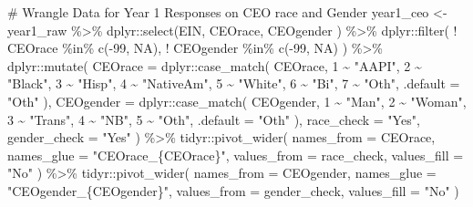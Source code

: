 \documentclass[
  letterpaper,
]{scrbook}
\newenvironment{Shaded}{\begin{snugshade}}{\end{snugshade}}
\newcommand{\AttributeTok}[1]{\textcolor[rgb]{0.40,0.45,0.13}{#1}}
\newcommand{\CommentTok}[1]{\textcolor[rgb]{0.37,0.37,0.37}{#1}}
\newcommand{\ConstantTok}[1]{\textcolor[rgb]{0.56,0.35,0.01}{#1}}
\newcommand{\DecValTok}[1]{\textcolor[rgb]{0.68,0.00,0.00}{#1}}
\newcommand{\FunctionTok}[1]{\textcolor[rgb]{0.28,0.35,0.67}{#1}}
\newcommand{\NormalTok}[1]{\textcolor[rgb]{0.00,0.23,0.31}{#1}}
\newcommand{\OtherTok}[1]{\textcolor[rgb]{0.00,0.23,0.31}{#1}}
\newcommand{\SpecialCharTok}[1]{\textcolor[rgb]{0.37,0.37,0.37}{#1}}
\newcommand{\StringTok}[1]{\textcolor[rgb]{0.13,0.47,0.30}{#1}}
\begin{document}
\begin{Shaded}
\begin{Highlighting}[]
\CommentTok{\# Wrangle Data for Year 1 Responses on CEO race and Gender}
\NormalTok{year1\_ceo }\OtherTok{\textless{}{-}}\NormalTok{ year1\_raw }\SpecialCharTok{\%\textgreater{}\%} 
\NormalTok{  dplyr}\SpecialCharTok{::}\FunctionTok{select}\NormalTok{(EIN, CEOrace, CEOgender ) }\SpecialCharTok{\%\textgreater{}\%} 
\NormalTok{  dplyr}\SpecialCharTok{::}\FunctionTok{filter}\NormalTok{(  }\SpecialCharTok{!}\NormalTok{ CEOrace }\SpecialCharTok{\%in\%} \FunctionTok{c}\NormalTok{(}\SpecialCharTok{{-}}\DecValTok{99}\NormalTok{, }\ConstantTok{NA}\NormalTok{),}
                  \SpecialCharTok{!}\NormalTok{ CEOgender }\SpecialCharTok{\%in\%} \FunctionTok{c}\NormalTok{(}\SpecialCharTok{{-}}\DecValTok{99}\NormalTok{, }\ConstantTok{NA}\NormalTok{)  ) }\SpecialCharTok{\%\textgreater{}\%} 
\NormalTok{  dplyr}\SpecialCharTok{::}\FunctionTok{mutate}\NormalTok{(}
    \AttributeTok{CEOrace =}\NormalTok{ dplyr}\SpecialCharTok{::}\FunctionTok{case\_match}\NormalTok{(}
\NormalTok{      CEOrace,}
      \DecValTok{1} \SpecialCharTok{\textasciitilde{}} \StringTok{"AAPI"}\NormalTok{, }\DecValTok{2} \SpecialCharTok{\textasciitilde{}} \StringTok{"Black"}\NormalTok{, }\DecValTok{3} \SpecialCharTok{\textasciitilde{}} \StringTok{"Hisp"}\NormalTok{, }\DecValTok{4} \SpecialCharTok{\textasciitilde{}} \StringTok{"NativeAm"}\NormalTok{, }\DecValTok{5} \SpecialCharTok{\textasciitilde{}} \StringTok{"White"}\NormalTok{, }\DecValTok{6} \SpecialCharTok{\textasciitilde{}} \StringTok{"Bi"}\NormalTok{, }\DecValTok{7} \SpecialCharTok{\textasciitilde{}} \StringTok{"Oth"}\NormalTok{,}
      \AttributeTok{.default =} \StringTok{"Oth"}
\NormalTok{    ),}
    \AttributeTok{CEOgender =}\NormalTok{ dplyr}\SpecialCharTok{::}\FunctionTok{case\_match}\NormalTok{(}
\NormalTok{      CEOgender,}
      \DecValTok{1} \SpecialCharTok{\textasciitilde{}} \StringTok{"Man"}\NormalTok{, }\DecValTok{2} \SpecialCharTok{\textasciitilde{}} \StringTok{"Woman"}\NormalTok{, }\DecValTok{3} \SpecialCharTok{\textasciitilde{}} \StringTok{"Trans"}\NormalTok{, }\DecValTok{4} \SpecialCharTok{\textasciitilde{}} \StringTok{"NB"}\NormalTok{, }\DecValTok{5} \SpecialCharTok{\textasciitilde{}} \StringTok{"Oth"}\NormalTok{,}
      \AttributeTok{.default =} \StringTok{"Oth"}
\NormalTok{    ),}
  \AttributeTok{race\_check =} \StringTok{"Yes"}\NormalTok{,}
  \AttributeTok{gender\_check =} \StringTok{"Yes"}
\NormalTok{  ) }\SpecialCharTok{\%\textgreater{}\%} 
\NormalTok{  tidyr}\SpecialCharTok{::}\FunctionTok{pivot\_wider}\NormalTok{(}
    \AttributeTok{names\_from =}\NormalTok{ CEOrace,}
    \AttributeTok{names\_glue =} \StringTok{"CEOrace\_\{CEOrace\}"}\NormalTok{,}
    \AttributeTok{values\_from =}\NormalTok{ race\_check, }
    \AttributeTok{values\_fill =} \StringTok{"No"}
\NormalTok{  ) }\SpecialCharTok{\%\textgreater{}\%} 
\NormalTok{  tidyr}\SpecialCharTok{::}\FunctionTok{pivot\_wider}\NormalTok{(}
    \AttributeTok{names\_from =}\NormalTok{ CEOgender,}
    \AttributeTok{names\_glue =} \StringTok{"CEOgender\_\{CEOgender\}"}\NormalTok{,}
    \AttributeTok{values\_from =}\NormalTok{ gender\_check, }
    \AttributeTok{values\_fill =} \StringTok{"No"}
\NormalTok{  )}


\end{Highlighting}
\end{Shaded}
\end{document}
